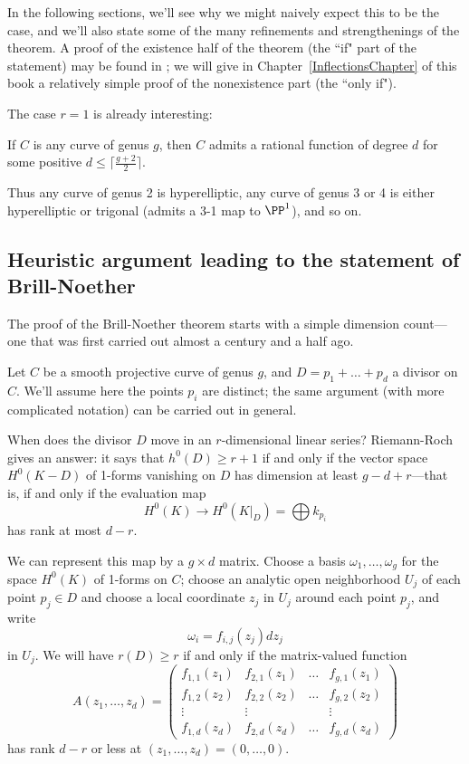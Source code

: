 
In the following sections, we'll see why we might naively expect this to be the case, and we'll also state some of the many refinements and strengthenings of the theorem.  A proof of the existence half of the theorem (the ``if" part of the statement) may be found in \cite[Theorem ****]{3264};  we will give in Chapter~\ref{InflectionsChapter} of this book a relatively simple proof of the nonexistence part (the ``only if"). 

The case $r=1$ is already interesting:

\begin{corollary}
If $C$ is any curve of genus $g$, then $C$ admits a rational function of degree $d$ for some positive $d \leq \lceil \frac{g+2}{2}\rceil$.
\end{corollary}

Thus any curve of genus 2 is hyperelliptic, any curve of genus 3 or 4 is either hyperelliptic or trigonal  (admits a 3-1 map to $\PP^1$), and so on.


\subsection{Heuristic argument leading to the statement of Brill-Noether}

The proof of the Brill-Noether theorem starts with a simple dimension count---one that was first carried out almost a century and a half ago. 

Let $C$ be a smooth projective curve of genus $g$, and $D = p_1 + \dots + p_d$ a divisor on $C$. We'll assume here the points $p_i$ are distinct; the same argument (with  more complicated notation) can be carried out in general.

When does the divisor $D$ move in an $r$-dimensional linear series? Riemann-Roch gives an answer: it says that $h^0(D) \geq r+1$ if and only if the vector space $H^0(K-D)$ of 1-forms vanishing on $D$ has dimension at least $g-d+r$---that is, if and only if the  evaluation map
$$
H^0(K) \to H^0(K|_D) = \bigoplus k_{p_i}
$$
has rank at most $d-r$. 

We can represent this map by a $g \times d$ matrix. Choose a basis $\omega_1,\dots,\omega_g$ for the space $H^0(K)$ of 1-forms on $C$; choose an analytic open neighborhood $U_j$ of each point $p_j \in D$ and choose a local coordinate $z_j$ in $U_j$ around each point $p_j$, and write
$$
\omega_i = f_{i,j}(z_j)dz_j
$$
in $U_j$. We will have $r(D) \geq r$ if and only if the  matrix-valued function
$$
A(z_1,\dots,z_d) = 
\begin{pmatrix}
f_{1,1}(z_1) & f_{2,1}(z_1) & \dots & f_{g,1}(z_1) \\
f_{1,2}(z_2) & f_{2,2}(z_2) & \dots & f_{g,2}(z_2) \\
\vdots & \vdots &  & \vdots \\
f_{1,d}(z_d) & f_{2,d}(z_d) & \dots & f_{g,d} (z_d)
\end{pmatrix}
$$
has rank $d-r$ or less at $(z_1,\dots,z_d) = (0,\dots,0)$.

